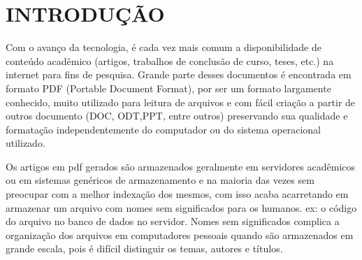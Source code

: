 \chapter{INTRODUÇÃO}

  Com o avanço da tecnologia, é cada vez mais comum a disponibilidade de conteúdo acadêmico (artigos, trabalhos de conclusão de curso, teses, etc.) na internet para fins de pesquisa. Grande parte desses documentos é encontrada em formato PDF (Portable Document Format), por ser um formato largamente conhecido, muito utilizado para leitura de arquivos e com fácil criação a partir de outros documento (DOC, ODT,PPT, entre outros) preservando sua qualidade e formatação independentemente do computador ou do sistema operacional utilizado.

 Os artigos em pdf gerados são armazenados geralmente em servidores acadêmicos ou em sistemas genéricos de armazenamento e na maioria das vezes sem preocupar com a melhor indexação dos mesmos, com isso acaba
acarretando em armazenar um arquivo com nomes sem significados para os humanos. ex:  o código do arquivo no banco de dados no servidor. Nomes sem significados complica a organização dos arquivos em computadores
pessoais quando são armazenados em grande escala, pois é difícil distinguir os temas, autores e títulos.




